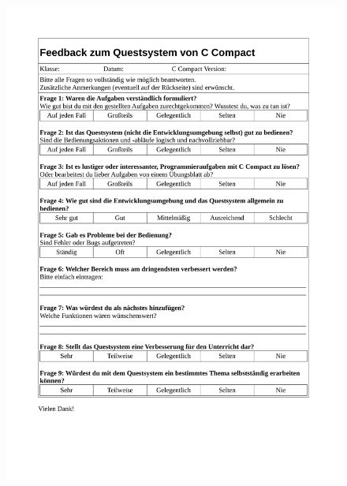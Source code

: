 \documentclass[11pt, oneside]{book}   		%
\begin{document}
\begin{figure}[h!]
	\centering
	\includegraphics[width=1.0\textwidth]{./media/docs/Fragebogen-quest.pdf}
	\label{fig:app-doc-fb-quest}
\end{figure}

%






\end{document}
